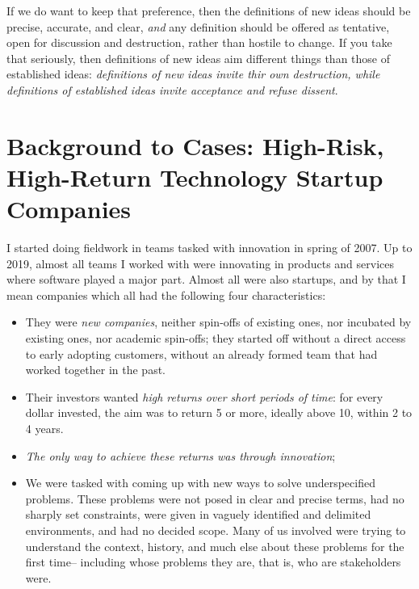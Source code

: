 \documentclass[graybox,envcountchap,sectrefs]{svmono}
\begin{document}
If we do want to keep that preference, then the definitions of new ideas should be precise, accurate, and clear, \textit{and} any definition should be offered as tentative, open for discussion and destruction, rather than hostile to change. If you take that seriously, then definitions of new ideas aim different things than those of established ideas: \textit{definitions of new ideas invite thir own destruction, while definitions of established ideas invite acceptance and refuse dissent}. 

\section{Background to Cases: High-Risk, High-Return Technology Startup Companies}\label{s:cases-background}
I started doing fieldwork in teams tasked with innovation in spring of 2007. Up to 2019, almost all teams I worked with were innovating in products and services where software played a major part. Almost all were also startups, and by that I mean companies which all had the following four characteristics: 
\begin{itemize}
    \item They were \textit{new companies}, neither spin-offs of existing ones, nor incubated by existing ones, nor academic spin-offs; they started off without a direct access to early adopting customers, without an already formed team that had worked together in the past.
    \item Their investors wanted \textit{high returns over short periods of time}: for every dollar invested, the aim was to return 5 or more, ideally above 10, within 2 to 4 years.
    \item \textit{The only way to achieve these returns was through innovation}; 
    \item We were tasked with coming up with new ways to solve underspecified problems. These problems were not posed in clear and precise terms, had no sharply set constraints, were given in  vaguely identified and delimited environments, and had no decided scope. Many of us involved were trying to understand the context, history, and much else about these problems for the first time-- including whose problems they are, that is, who are stakeholders were.
\end{itemize}
\end{document}
